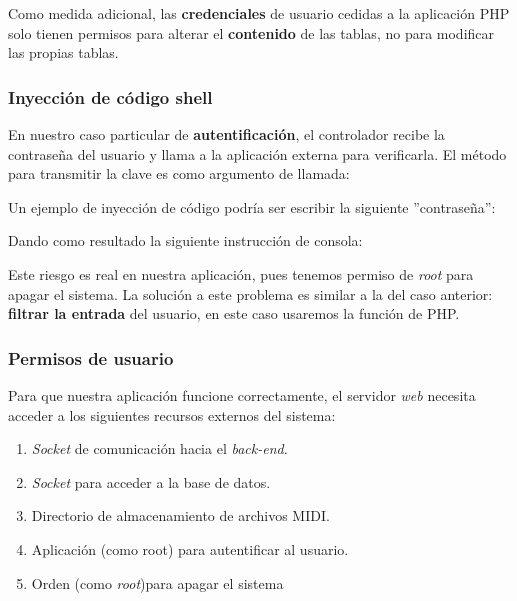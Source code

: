 Como medida adicional, las \textbf{credenciales} de usuario cedidas a la aplicación PHP solo tienen permisos para alterar el \textbf{contenido} de las tablas, no para modificar las propias tablas.

\subsubsection{Inyección de código shell}

En nuestro caso particular de \textbf{autentificación}, el controlador recibe la contraseña del usuario y llama a la aplicación externa para verificarla. El método para transmitir la clave es como argumento de llamada:

\begin{center}
\end{center}

Un ejemplo de inyección de código podría ser escribir la siguiente ''contraseña'':

\begin{center}
\end{center}

Dando como resultado la siguiente instrucción de consola:

\begin{center}
\end{center}

Este riesgo es real en nuestra aplicación, pues tenemos permiso de \textit{root} para apagar el sistema. La solución a este problema es similar a la del caso anterior: \textbf{filtrar la entrada} del usuario, en este caso usaremos la función  de PHP.

\subsubsection{Permisos de usuario}

Para que nuestra aplicación funcione correctamente, el servidor \textit{web} necesita acceder a los siguientes recursos externos del sistema:

\begin{enumerate}
	\item \textit{Socket} de comunicación hacia el \textit{back-end}.
	\item \textit{Socket} para acceder a la base de datos.
	\item Directorio de almacenamiento de archivos \acrshort{MIDI}.
	\item Aplicación  (como root) para autentificar al usuario.
	\item Orden  (como \textit{root})para apagar el sistema
\end{enumerate}

